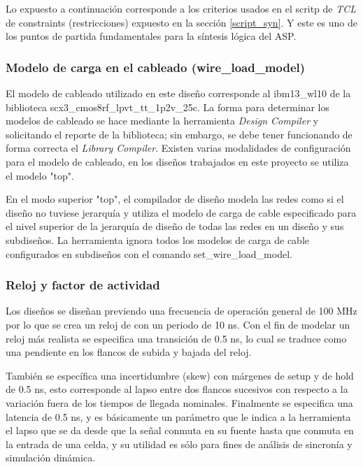 Lo expuesto a continuación corresponde a los criterios usados en el scritp de \textit{TCL} de constraints (restricciones) expuesto en la sección \ref{script_syn}. Y este es uno de los puntos de partida fundamentales para la síntesis lógica del ASP.

\subsubsection{Modelo de carga en el cableado (wire\_load\_model)}
El modelo de cableado utilizado en este diseño corresponde al ibm13\_wl10 de la biblioteca scx3\_cmos8rf\_lpvt\_tt\_1p2v\_25c. La forma para determinar los modelos de cableado se hace mediante la herramienta \textit{Design Compiler} y solicitando el reporte de la biblioteca; sin embargo, se debe tener funcionando de forma correcta el \textit{Library Compiler}. Existen varias modalidades de configuración para el modelo de cableado, en los diseños trabajados en este proyecto se utiliza el modelo "top".

En el modo superior "top", el compilador de diseño modela las redes como si el diseño no tuviese jerarquía y utiliza el modelo de carga de cable especificado para el nivel superior de la jerarquía de diseño de todas las redes en un diseño y sus subdiseños. La herramienta ignora todos los modelos de carga de cable configurados en subdiseños con el comando set\_wire\_load\_model.

\subsubsection{Reloj y factor de actividad}

Los diseños se diseñan previendo una frecuencia de operación general de 100 MHz por lo que se crea un reloj de con un periodo de 10 ns. Con el fin de modelar un reloj más realista se especifica una transición de 0.5 ns, lo cual se traduce como una pendiente en los flancos de subida y bajada del reloj.

También se específica una incertidumbre (skew) con márgenes de setup y de hold de 0.5 ns, esto corresponde al lapso entre dos flancos sucesivos con respecto a la variación fuera de los tiempos de llegada nominales. Finalmente se especifica una latencia de 0.5 ns, y es básicamente un parámetro que le indica a la herramienta el lapso que se da desde que la señal conmuta en su fuente hasta que conmuta en la entrada de una celda, y su utilidad es sólo para fines de análisis de sincronía y simulación dinámica.

